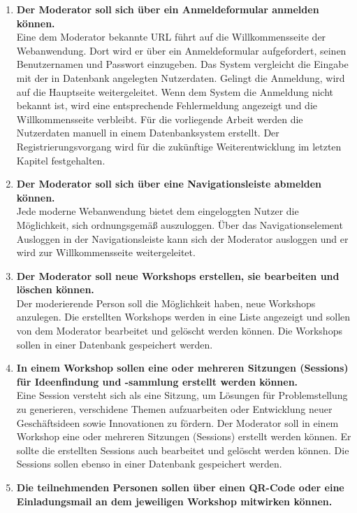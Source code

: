 \begin{enumerate}
\item \textbf{Der Moderator soll sich über ein Anmeldeformular anmelden können.}\\
Eine dem Moderator bekannte URL führt auf die Willkommensseite der Webanwendung. Dort wird er über ein Anmeldeformular aufgefordert, seinen Benutzernamen und Passwort einzugeben. Das System vergleicht die Eingabe mit der in Datenbank angelegten Nutzerdaten. Gelingt die Anmeldung, wird auf die Hauptseite weitergeleitet. Wenn dem System die Anmeldung nicht bekannt ist, wird eine entsprechende Fehlermeldung angezeigt und die Willkommensseite verbleibt. Für die vorliegende Arbeit werden die Nutzerdaten manuell in einem Datenbanksystem erstellt. Der Registrierungsvorgang wird für die zukünftige Weiterentwicklung im letzten Kapitel festgehalten. 
\item \textbf{Der Moderator soll sich über eine Navigationsleiste abmelden können.}\\ 
Jede moderne Webanwendung bietet dem eingeloggten Nutzer die Möglichkeit, sich ordnungsgemäß auszuloggen. Über das Navigationselement \glqq Ausloggen\grqq{} in der Navigationsleiste kann sich der Moderator ausloggen und er wird zur Willkommensseite weitergeleitet.
\item \textbf{Der Moderator soll neue Workshops erstellen, sie bearbeiten und löschen können.}\\
Der moderierende Person soll die Möglichkeit haben, neue Workshops anzulegen. Die erstellten Workshops werden in eine Liste angezeigt und sollen von dem Moderator bearbeitet und gelöscht werden können. Die Workshops sollen in einer Datenbank gespeichert werden.
\item \textbf{In einem Workshop sollen eine oder mehreren Sitzungen (Sessions) für Ideenfindung und -sammlung erstellt werden können.}\\
Eine Session versteht sich als eine Sitzung, um Lösungen für Problemstellung zu generieren, verschidene Themen aufzuarbeiten oder Entwicklung neuer Geschäftsideen sowie Innovationen zu fördern. Der Moderator soll in einem Workshop eine oder mehreren Sitzungen (Sessions) erstellt werden können. Er sollte die erstellten Sessions auch bearbeitet und gelöscht werden können. Die Sessions sollen ebenso in einer Datenbank gespeichert werden.
\item \textbf{Die teilnehmenden Personen sollen über einen QR-Code oder eine Einladungsmail an dem jeweiligen Workshop mitwirken können.}\\

\end{enumerate}
